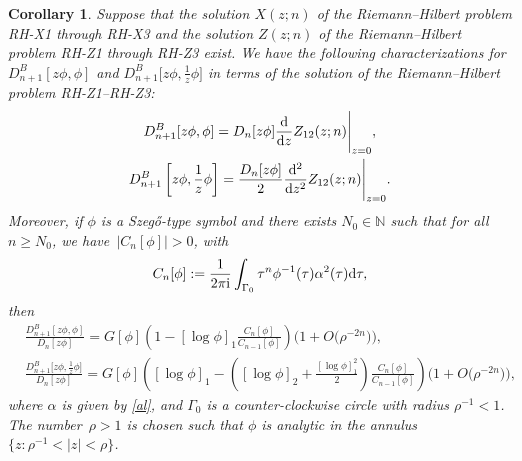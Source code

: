 \documentclass[10pt,a4paper]{amsart}
\numberwithin{equation}{section}
\newtheorem{Corollary}[Theorem]{Corollary}
\newcommand{\N}{{\mathbb N}}
\newcommand{\al}{\alpha}
\newcommand{\Ga}{\Gamma}
\newcommand{\ii}{{\rm i}}
\newcommand{\dd}{{\rm d}}
\begin{document}
		\begin{Corollary}\label{Cor zphi phi and phi/z}
			Suppose that the solution $X(z;n)$ of the Riemann--Hilbert problem {\rm RH-X1} through {\rm RH-X3} and the solution $Z(z;n)$ of the Riemann--Hilbert problem {\rm RH-Z1} through {\rm RH-Z3} exist. We have the following characterizations for $D^B_{n+1}[z\phi,\phi]$ and $D^B_{n+1}\big[z\phi,\frac{1}{z}\phi\big]$ in terms of the solution of the Riemann--Hilbert problem {\rm RH-Z1}--{\rm RH-Z3}:
			\begin{gather*}
				D^B_{n+1}[z\phi,\phi] = D_n[z\phi] \frac{\dd}{\dd z}Z_{12}(z;n) \Bigg|_{z=0}, \\
				D^B_{n+1}\left[z\phi,\frac{1}{z}\phi\right] = \frac{D_n[z\phi]}{2} \frac{\dd^2}{\dd z^2}Z_{12}(z;n) \Bigg|_{z=0}.
			\end{gather*}
			Moreover, if $\phi$ is a Szeg\H{o}-type symbol and there exists $N_0 \in \N$ such that for all $n \geq N_0$, we have~${|C_n[\phi]|>0}$, with
			\begin{equation}\label{Cnphi}
				C_n[\phi] := \frac{1}{2 \pi \ii} \int_{\Ga_0} \tau^n \phi^{-1}(\tau) \al^2(\tau) \dd \tau,
			\end{equation}
			then
			\begin{align}
				&\frac{D^B_{n+1}[z\phi,\phi]}{D_n[z\phi]}	 = G[\phi] \left( 1 - [\log \phi]_1 \frac{C_n[\phi]}{C_{n-1}[\phi]} \right) \big(1 + O\big(\rho^{-2n}\big)\big), \label{asymp zphi phi} \\	
&	\frac{D^B_{n+1}\big[z\phi,\frac{1}{z}\phi\big]}{D_n[z\phi]}	 = G[\phi] \left( [\log \phi]_1 - \left( [\log \phi]_2 +\frac{[\log \phi]^2_1}{2}\right) \frac{C_n[\phi]}{C_{n-1}[\phi]} \right) \big(1 + O\big(\rho^{-2n}\big)\big), \label{asymp zphi phi/z}
			\end{align}
			where $\al$ is given by \eqref{al}, and $\Ga_0$ is a counter-clockwise circle with radius $\rho^{-1}<1$. The number~${\rho>1}$ is chosen such that $\phi$ is analytic in the annulus $\{z\colon \rho^{-1}<|z|<\rho\}$.
		\end{Corollary}
\end{document}
